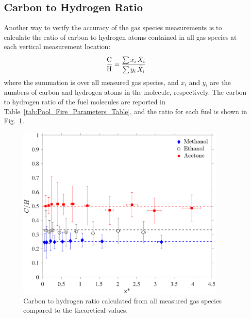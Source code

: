 \documentclass[12pt]{article}
\begin{document}
\subsection{Carbon to Hydrogen Ratio}

Another way to verify the accuracy of the gas species measurements is to calculate the ratio of carbon to hydrogen atoms contained in all gas species at each vertical measurement location:
\begin{equation}\label{eq:c2h_ratio}
  \frac{\rm C}{\rm H}=\frac{ \sum  x_i \, \bar{X}_{i} }{ \sum y_i \, \bar{X}_{i} }
\end{equation}
where the summation is over all measured gas species, and $x_i$ and $y_i$ are the numbers of carbon and hydrogen atoms in the molecule, respectively. The carbon to hydrogen ratio of the fuel molecules are reported in Table~\ref{tab:Pool_Fire_Parameters_Table}, and the ratio for each fuel is shown in Fig.~\ref{fig:C2H}.

\begin{figure}[h!]
	\centering
\includegraphics[width=10.5cm, keepaspectratio]{C2H_ratio_Comparison.pdf}
	\caption[Carbon to hydrogen ratio calculated from all species]{Carbon to hydrogen ratio calculated from all measured gas species compared to the theoretical values.}
	\label{fig:C2H}
\end{figure}
\end{document}
